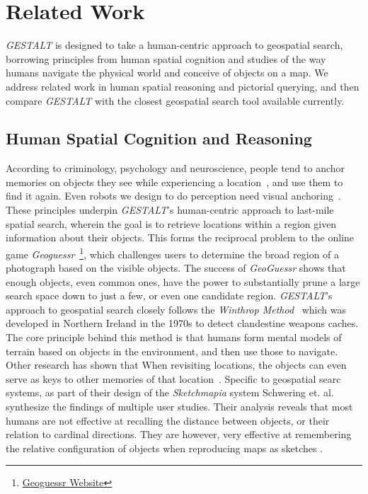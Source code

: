 \section{Related Work}
\label{section:related}

\emph{GESTALT} is designed to take a human-centric approach to geospatial search, borrowing principles from human spatial cognition and studies of the way humans navigate the physical world and conceive of objects on a map.
We address related work in human spatial reasoning and pictorial querying, and then compare \emph{GESTALT} with the closest geospatial search tool available currently.

\subsection{Human Spatial Cognition and Reasoning}
According to criminology, psychology and neuroscience, people tend to anchor memories on objects they see while experiencing a location~\cite{Helbing2020}, and use them to find it again. 
Even robots we design to do perception need visual anchoring~\cite{Oliveira2016}.
These principles underpin \emph{GESTALT}'s human-centric approach to last-mile spatial search, wherein the goal is to retrieve locations within a region given information about their objects.
This forms the reciprocal problem to the online game \textit{Geoguessr}~\footnote{\href{https://www.geoguessr.com/}{Geoguessr Website}}, which challenges users to determine the broad region of a photograph based on the visible objects.
The success of \textit{GeoGuessr} shows that enough objects, even common ones, have the power to substantially prune a large search space down to just a few, or even one candidate region.
\emph{GESTALT}'s approach to geospatial search closely follows the \textit{Winthrop Method}~\cite{Keatley2021} which was developed in Northern Ireland in the 1970s to detect clandestine weapons caches.
The core principle behind this method is that humans form mental models of terrain based on objects in the environment, and then use those to navigate.
Other research has shown that When revisiting locations, the objects can even serve as keys to other memories of that location~\cite{Miller2013}.
Specific to geospatial searc systems, as part of their design of the \textit{Sketchmapia} system Schwering et. al. synthesize the findings of multiple user studies. Their analysis reveals that most humans are not effective at recalling the distance between objects, or their relation to cardinal directions. They are however, very effective at remembering the relative configuration of objects when reproducing maps as sketches \cite{Schwering2014}.




